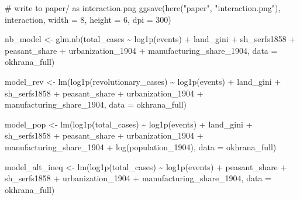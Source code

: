 \documentclass[
  11pt,
  letterpaper,
  DIV=11,
  numbers=noendperiod]{scrartcl}
\newenvironment{Shaded}{\begin{snugshade}}{\end{snugshade}}
\newcommand{\AttributeTok}[1]{\textcolor[rgb]{0.16,0.50,0.73}{#1}}
\newcommand{\CommentTok}[1]{\textcolor[rgb]{0.48,0.49,0.49}{#1}}
\newcommand{\DecValTok}[1]{\textcolor[rgb]{0.96,0.45,0.00}{#1}}
\newcommand{\FunctionTok}[1]{\textcolor[rgb]{0.56,0.27,0.68}{#1}}
\newcommand{\NormalTok}[1]{\textcolor[rgb]{0.81,0.81,0.76}{#1}}
\newcommand{\OtherTok}[1]{\textcolor[rgb]{0.15,0.68,0.38}{#1}}
\newcommand{\SpecialCharTok}[1]{\textcolor[rgb]{0.24,0.68,0.91}{#1}}
\newcommand{\StringTok}[1]{\textcolor[rgb]{0.96,0.31,0.31}{#1}}
\begin{document}
\begin{Shaded}
\begin{Highlighting}[]
\CommentTok{\# write to paper/ as interaction.png}
\FunctionTok{ggsave}\NormalTok{(}\FunctionTok{here}\NormalTok{(}\StringTok{"paper"}\NormalTok{, }\StringTok{"interaction.png"}\NormalTok{), }
\NormalTok{       interaction, }\AttributeTok{width =} \DecValTok{8}\NormalTok{, }\AttributeTok{height =} \DecValTok{6}\NormalTok{, }\AttributeTok{dpi =} \DecValTok{300}\NormalTok{)}
\end{Highlighting}
\end{Shaded}

\begin{Shaded}
\begin{Highlighting}[]
\NormalTok{nb\_model }\OtherTok{\textless{}{-}} \FunctionTok{glm.nb}\NormalTok{(total\_cases }\SpecialCharTok{\textasciitilde{}} \FunctionTok{log1p}\NormalTok{(events) }\SpecialCharTok{+}\NormalTok{ land\_gini }\SpecialCharTok{+}\NormalTok{ sh\_serfs1858}
                   \SpecialCharTok{+}\NormalTok{ peasant\_share }\SpecialCharTok{+}\NormalTok{ urbanization\_1904}
                   \SpecialCharTok{+}\NormalTok{ manufacturing\_share\_1904,}
                   \AttributeTok{data =}\NormalTok{ okhrana\_full)}

\NormalTok{model\_rev }\OtherTok{\textless{}{-}} \FunctionTok{lm}\NormalTok{(}\FunctionTok{log1p}\NormalTok{(revolutionary\_cases) }\SpecialCharTok{\textasciitilde{}} \FunctionTok{log1p}\NormalTok{(events) }\SpecialCharTok{+}\NormalTok{ land\_gini }
                \SpecialCharTok{+}\NormalTok{ sh\_serfs1858 }\SpecialCharTok{+}\NormalTok{ peasant\_share}
                \SpecialCharTok{+}\NormalTok{ urbanization\_1904 }\SpecialCharTok{+}\NormalTok{ manufacturing\_share\_1904, }
                \AttributeTok{data =}\NormalTok{ okhrana\_full)}

\NormalTok{model\_pop }\OtherTok{\textless{}{-}} \FunctionTok{lm}\NormalTok{(}\FunctionTok{log1p}\NormalTok{(total\_cases) }\SpecialCharTok{\textasciitilde{}}  \FunctionTok{log1p}\NormalTok{(events) }\SpecialCharTok{+}\NormalTok{ land\_gini}
                \SpecialCharTok{+}\NormalTok{ sh\_serfs1858 }\SpecialCharTok{+}\NormalTok{ peasant\_share }\SpecialCharTok{+}\NormalTok{ urbanization\_1904}
                \SpecialCharTok{+}\NormalTok{ manufacturing\_share\_1904 }\SpecialCharTok{+}
                  \FunctionTok{log}\NormalTok{(population\_1904),}
                \AttributeTok{data =}\NormalTok{ okhrana\_full)}

\NormalTok{model\_alt\_ineq }\OtherTok{\textless{}{-}} \FunctionTok{lm}\NormalTok{(}\FunctionTok{log1p}\NormalTok{(total\_cases) }\SpecialCharTok{\textasciitilde{}} \FunctionTok{log1p}\NormalTok{(events)}
                     \SpecialCharTok{+}\NormalTok{ peasant\_share }\SpecialCharTok{+}\NormalTok{ sh\_serfs1858}
                     \SpecialCharTok{+}\NormalTok{ urbanization\_1904 }\SpecialCharTok{+}\NormalTok{ manufacturing\_share\_1904,}
                    \AttributeTok{data =}\NormalTok{ okhrana\_full)}


\end{Highlighting}
\end{Shaded}
\end{document}
